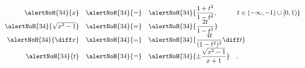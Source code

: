 \begin{frame}
{\begin{definition}
\[
\begin{array}{rcl}
\alertNoH{34}{
x} &\alertNoH{34}{=}&\displaystyle \alertNoH{34}{ \frac{1+t^2}{1-t^2}, \quad \quad \quad t\in (-\infty, -1) \cup \left[0, 1 \right)} \\
\alertNoH{34}{\sqrt{x^2-1}}&\alertNoH{34}{=}&\displaystyle \alertNoH{34}{\frac{2t}{1-t^2}}  \\
\alertNoH{34}{\diff x}&\alertNoH{34}{=}&\displaystyle  \alertNoH{34}{\frac{4 t}{(1- t^{2})^{2}} \diff t}\\
\alertNoH{34}{t}&\alertNoH{34}{=}&\displaystyle \alertNoH{34}{\pm \frac{ \sqrt{x^2-1}}{x+1} }\quad .
\end{array}
\]
\end{definition}
}

\vspace{8cm}
\end{frame}
